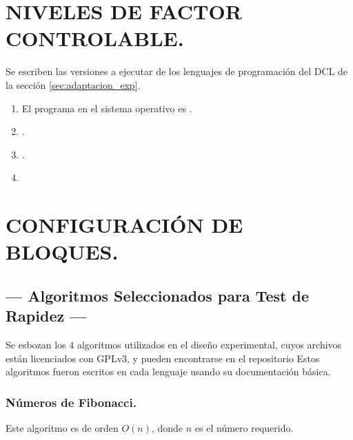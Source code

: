\documentclass[11pt,a4paper]{article}
\begin{document}
\section{NIVELES DE FACTOR CONTROLABLE.} %
\label{sec:niveles_fact_control}
Se escriben las versiones a ejecutar de los lenguajes de programación del DCL de la sección \ref{sec:adaptacion_exp}.
\begin{enumerate}[noitemsep]
	\item[\fbox{\texttt{C}}] El programa en el sistema operativo es .
	\item[\fbox{\texttt{Python}}] .
	\item[\fbox{\texttt{R}}] .
	\item[\fbox{\texttt{Ruby}}] 
\end{enumerate}

\section{CONFIGURACIÓN DE BLOQUES.} %
\label{sec:conf_bloques}

\subsection{--- Algoritmos Seleccionados para Test de Rapidez ---} %
\label{sub:algoritmos}
Se esbozan los \(4\) algoritmos utilizados en el diseño experimental, cuyos archivos están licenciados con GPLv3, y pueden encontrarse en el repositorio %
Estos algoritmos fueron escritos en cada lenguaje usando su documentación básica. 
 
\subsubsection{Números de Fibonacci.} %
\label{subs:fibo}
Este algoritmo es de orden \(O(n)\), donde \(n\) es el número requerido.
\end{document}

